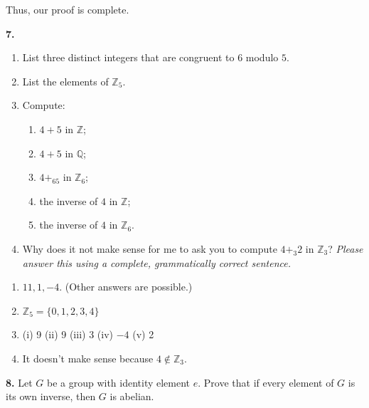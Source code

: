 \documentclass[10pt,]{book}
\theoremstyle{plain}
\theoremstyle{definition}
\theoremstyle{definition}
\theoremstyle{definition}
\theoremstyle{definition}
\numberwithin{equation}{section}
\def\Z{\mathbb{Z}}
\def\Q{\mathbb{Q}}
\begin{document}
      Thus, our proof is complete.
\par\smallskip
\noindent\textbf{7.}\quad{}\leavevmode%
\begin{enumerate}[label=(\alph*)]
\item\hypertarget{li-119}{}
          List three distinct integers that are congruent to \(6\) modulo \(5\).
\item\hypertarget{li-120}{}
          List the elements of \(\Z_5\).
\item\hypertarget{li-121}{}
          Compute:
\begin{enumerate}[label=\roman*.]
\item\hypertarget{li-122}{}
                \(4+5\) in \(\Z\);
\item\hypertarget{li-123}{}
                \(4+5\) in \(\Q\);
\item\hypertarget{li-124}{}
                \(4+_65\) in \(\Z_6\);
\item\hypertarget{li-125}{}
                the inverse of \(4\) in \(\Z\);
\item\hypertarget{li-126}{}
                the inverse of \(4\) in \(\Z_6\).
\end{enumerate}

\item\hypertarget{li-127}{}
          Why does it not make sense for me to ask you to compute \(4+_3 2\) in \(\Z_3\)? \emph{Please answer this using a complete, grammatically correct sentence.}
\end{enumerate}
\par\smallskip
\leavevmode%
\begin{enumerate}[label=(\alph*)]
\item\hypertarget{li-128}{}
          \(11, 1, -4\). (Other answers are possible.)
\item\hypertarget{li-129}{}
          \(\Z_5=\{0,1,2,3,4\}\)
\item\hypertarget{li-130}{}
          (i) 9   (ii) 9   (iii) 3   (iv) \(-4\)   (v) 2
\item\hypertarget{li-131}{}
          It doesn't make sense because \(4\not\in \Z_3\).
\end{enumerate}
\par\smallskip
\noindent\textbf{8.}\quad{}
        Let \(G\) be a group with identity element \(e\). Prove that if every element of \(G\) is its own inverse, then \(G\) is abelian.
\par\smallskip
\end{document}
